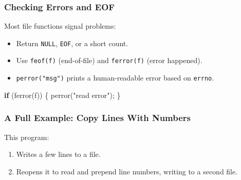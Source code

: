 \documentclass[
  letterpaper,
  DIV=11,
  numbers=noendperiod]{scrreprt}
\newenvironment{Shaded}{\begin{snugshade}}{\end{snugshade}}
\newcommand{\ControlFlowTok}[1]{\textcolor[rgb]{0.00,0.23,0.31}{\textbf{#1}}}
\newcommand{\NormalTok}[1]{\textcolor[rgb]{0.00,0.23,0.31}{#1}}
\newcommand{\OperatorTok}[1]{\textcolor[rgb]{0.37,0.37,0.37}{#1}}
\newcommand{\StringTok}[1]{\textcolor[rgb]{0.13,0.47,0.30}{#1}}
\providecommand{\tightlist}{%
  \setlength{\itemsep}{0pt}\setlength{\parskip}{0pt}}
\begin{document}
\subsubsection{Checking Errors and EOF}\label{checking-errors-and-eof}

Most file functions signal problems:

\begin{itemize}
\tightlist
\item
  Return \texttt{NULL}, \texttt{EOF}, or a short count.
\item
  Use \texttt{feof(f)} (end-of-file) and \texttt{ferror(f)} (error
  happened).
\item
  \texttt{perror("msg")} prints a human-readable error based on
  \texttt{errno}.
\end{itemize}

\begin{Shaded}
\begin{Highlighting}[]
\ControlFlowTok{if} \OperatorTok{(}\NormalTok{ferror}\OperatorTok{(}\NormalTok{f}\OperatorTok{))} \OperatorTok{\{}\NormalTok{ perror}\OperatorTok{(}\StringTok{"read error"}\OperatorTok{);} \OperatorTok{\}}
\end{Highlighting}
\end{Shaded}

\subsubsection{A Full Example: Copy Lines With
Numbers}\label{a-full-example-copy-lines-with-numbers}

This program:

\begin{enumerate}
\def\labelenumi{\arabic{enumi}.}
\tightlist
\item
  Writes a few lines to a file.
\item
  Reopens it to read and prepend line numbers, writing to a second file.
\end{enumerate}
\end{document}
